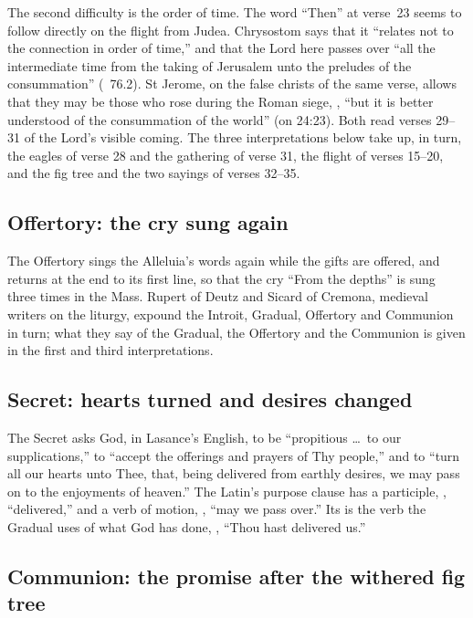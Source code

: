 The second difficulty is the order of time. The word ``Then'' at verse~23
seems to follow directly on the flight from Judea. Chrysostom says that it
``relates not to the connection in order of time,'' and that the Lord here
passes over ``all the intermediate time from the taking of Jerusalem unto the
preludes of the consummation'' (~76.2). St Jerome, on the
false christs of the same verse, allows that they may be those who rose during
the Roman siege, , ``but
it is better understood of the consummation of the world'' (on 24:23). Both
read verses 29--31 of the Lord's visible coming. The three interpretations
below take up, in turn, the eagles of verse 28 and the gathering of verse 31,
the flight of verses 15--20, and the fig tree and the two sayings of verses
32--35.

\subsection{Offertory: the cry sung again}
\label{sec:element-offertory}

The Offertory sings the Alleluia's words again while the gifts are offered,
and returns at the end to its first line, so that the cry ``From the depths''
is sung three times in the Mass. Rupert of Deutz and Sicard of Cremona,
medieval writers on the liturgy, expound the Introit, Gradual, Offertory and
Communion in turn; what they say of the Gradual, the Offertory and the
Communion is given in the first and third interpretations.

\subsection{Secret: hearts turned and desires changed}
\label{sec:element-secret}

The Secret asks God, in Lasance's English, to be ``propitious \dots\ to our
supplications,'' to ``accept the offerings and prayers of Thy people,'' and to
``turn all our hearts unto Thee, that, being delivered from earthly desires,
we may pass on to the enjoyments of heaven.'' The Latin's purpose clause has a
participle, , ``delivered,'' and a verb of motion,
, ``may we pass over.'' Its  is the verb the Gradual uses of what God has done,
, ``Thou hast delivered us.''

\subsection{Communion: the promise after the withered fig tree}
\label{sec:element-communion}

